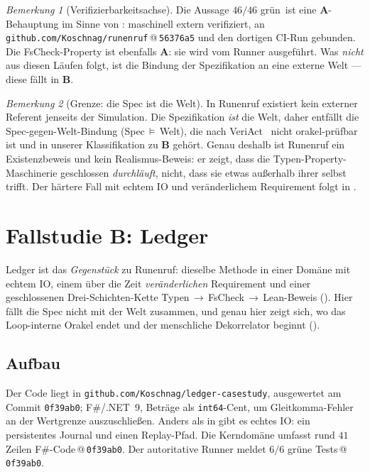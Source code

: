 \documentclass[11pt,a4paper]{article}
\newcommand{\AB}[1]{\textbf{#1}}
\theoremstyle{definition}
\theoremstyle{remark}
\newtheorem{bemerkung}{Bemerkung}[section]
\begin{document}
\begin{bemerkung}[Verifizierbarkeitsachse]
\label{bem:runenruf-achse}
Die Aussage \glqq $46/46$ grün\grqq\ ist eine \AB{A}-Behauptung im Sinne von
: maschinell extern verifiziert, an \texttt{github.com/Koschnag/runenruf}\,@\,\texttt{56376a5}
und den dortigen CI-Run gebunden. Die FsCheck-Property ist ebenfalls \AB{A}: sie wird vom
Runner ausgeführt. Was \emph{nicht} aus diesen Läufen folgt, ist die Bindung der Spezifikation
an eine externe Welt --- diese fällt in \AB{B}.
\end{bemerkung}

\begin{bemerkung}[Grenze: die Spec ist die Welt]
\label{bem:runenruf-grenze}
In Runenruf existiert kein externer Referent jenseits der Simulation. Die Spezifikation
\emph{ist} die Welt, daher entfällt die Spec-gegen-Welt-Bindung
(\glqq{}Spec\,$\models$\,Welt\grqq), die nach VeriAct~\cite{veriact2026} nicht
orakel-prüfbar ist und in unserer Klassifikation zu \AB{B} gehört. Genau deshalb ist
Runenruf ein Existenzbeweis und kein Realismus-Beweis: er zeigt, dass die
Typen-Property-Maschinerie geschlossen \emph{durchläuft}, nicht, dass sie etwas außerhalb ihrer
selbst trifft. Der härtere Fall mit echtem IO und veränderlichem Requirement folgt in
.
\end{bemerkung}

\section{Fallstudie B: Ledger}
\label{sec:ledger}

Ledger ist das \emph{Gegenstück} zu Runenruf: dieselbe Methode in einer Domäne mit echtem IO,
einem über die Zeit \emph{veränderlichen} Requirement und einer geschlossenen Drei-Schichten-Kette
Typen\,$\rightarrow$\,FsCheck\,$\rightarrow$\,Lean-Beweis (). Hier
fällt die Spec nicht mit der Welt zusammen, und genau hier zeigt sich, wo das Loop-interne Orakel
endet und der menschliche Dekorrelator beginnt ().

\subsection{Aufbau}
\label{sec:ledger-aufbau}

Der Code liegt in \texttt{github.com/Koschnag/ledger-casestudy}, ausgewertet am Commit
\texttt{0f39ab0}; F\#/.NET~9, Beträge als \texttt{int64}-Cent, um Gleitkomma-Fehler an der
Wertgrenze auszuschließen. Anders als in  gibt es echtes IO: ein persistentes
Journal und einen Replay-Pfad. Die Kerndomäne umfasst rund $41$ Zeilen
F\#-Code\,@\,\texttt{0f39ab0}. Der autoritative Runner meldet $6/6$ grüne
Tests\,@\,\texttt{0f39ab0}.
\end{document}
